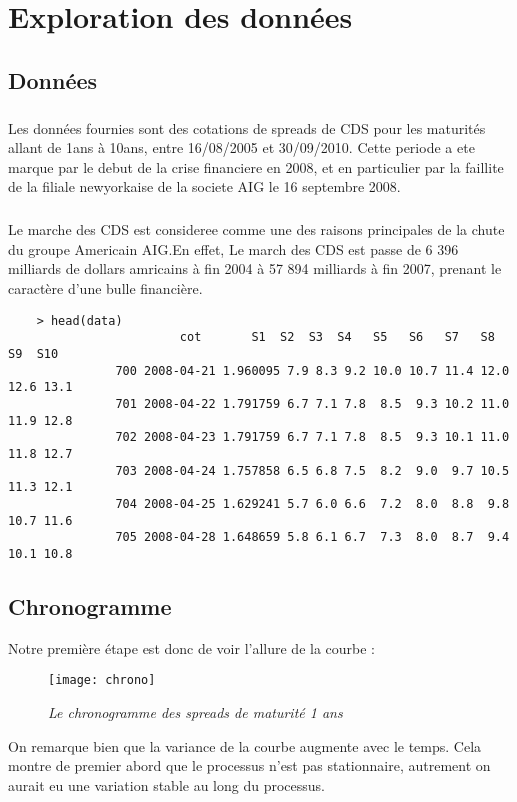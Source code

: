 \section{Exploration des données} 
    \subsection{Données}
    \subparagraph{} Les données fournies sont des cotations de spreads de CDS pour les maturités
    allant de 1ans à 10ans, entre 16/08/2005 et
    30/09/2010. 
    Cette periode a ete marque par le debut de la crise financiere en 2008, et en
    particulier par la faillite de la filiale newyorkaise de la societe AIG le 16
    septembre 2008. 
    \subparagraph{}
    Le marche des CDS est consideree comme une des raisons principales de la chute
    du groupe Americain AIG.En effet, Le march des CDS est passe de 6 396 milliards de dollars
    amricains à fin 2004 à 57 894 milliards à fin 2007, prenant le caractère d'une
    bulle financière.

    \begin{verbatim}
    > head(data)
                        cot       S1  S2  S3  S4   S5   S6   S7   S8   S9  S10
               700 2008-04-21 1.960095 7.9 8.3 9.2 10.0 10.7 11.4 12.0 12.6 13.1
               701 2008-04-22 1.791759 6.7 7.1 7.8  8.5  9.3 10.2 11.0 11.9 12.8
               702 2008-04-23 1.791759 6.7 7.1 7.8  8.5  9.3 10.1 11.0 11.8 12.7
               703 2008-04-24 1.757858 6.5 6.8 7.5  8.2  9.0  9.7 10.5 11.3 12.1
               704 2008-04-25 1.629241 5.7 6.0 6.6  7.2  8.0  8.8  9.8 10.7 11.6
               705 2008-04-28 1.648659 5.8 6.1 6.7  7.3  8.0  8.7  9.4 10.1 10.8
    \end{verbatim}

    \subsection{Chronogramme} 
    Notre première étape est donc de voir l'allure de la courbe :
    \begin{figure}[H]
        \centering
        \label{fig:chrono} 
        \texttt{[image: chrono]} 
        \caption{\it Le chronogramme des spreads de maturité 1 ans } 
    \end{figure}

    On remarque bien que la variance de la courbe augmente avec le temps. Cela
    montre de premier abord que le processus n'est pas stationnaire, autrement
    on aurait eu une variation stable au long du processus.

